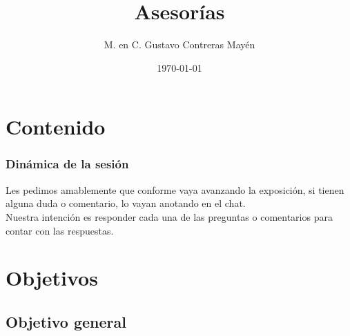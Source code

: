 
\title{\large{Asesorías}}
\author{M. en C. Gustavo Contreras Mayén}
\date{\today}

\maketitle
\fontsize{14}{14}\selectfont
{}
\section*{Contenido}

\begin{frame}
\frametitle{Dinámica de la sesión}
Les pedimos amablemente que conforme vaya avanzando la exposición, si tienen alguna duda o comentario, lo vayan anotando en el chat.
\\
\bigskip
\pause
Nuestra intención es responder cada una de las preguntas o comentarios para contar con las respuestas.
\end{frame}

\section{Objetivos}
\subsection{Objetivo general}

